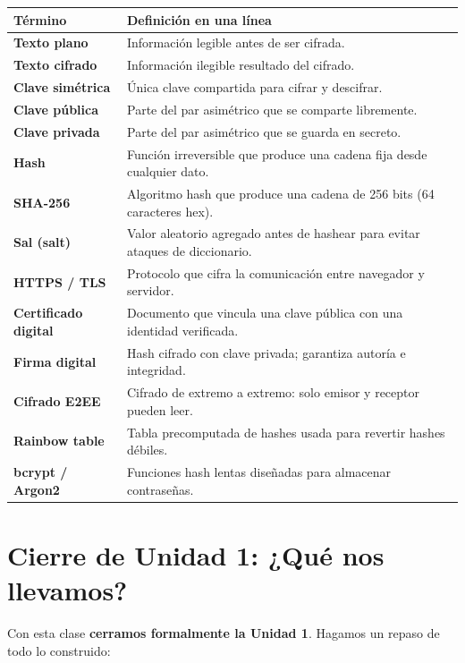 \documentclass[12pt,a4paper]{article}
\renewcommand{\arraystretch}{1.25}
\begin{document}
\renewcommand{\arraystretch}{1.4}
\begin{tabularx}{\textwidth}{>{\bfseries}p{4.5cm}X}
\toprule
\textbf{T\'ermino} & \textbf{Definici\'on en una línea} \\
\midrule
Texto plano & Informaci\'on legible antes de ser cifrada. \\
Texto cifrado & Informaci\'on ilegible resultado del cifrado. \\
Clave sim\'etrica & \'Unica clave compartida para cifrar y descifrar. \\
Clave p\'ublica & Parte del par asim\'etrico que se comparte libremente. \\
Clave privada & Parte del par asim\'etrico que se guarda en secreto. \\
Hash & Funci\'on irreversible que produce una cadena fija desde cualquier dato. \\
SHA-256 & Algoritmo hash que produce una cadena de 256 bits (64 caracteres hex). \\
Sal (salt) & Valor aleatorio agregado antes de hashear para evitar ataques de diccionario. \\
HTTPS / TLS & Protocolo que cifra la comunicaci\'on entre navegador y servidor. \\
Certificado digital & Documento que vincula una clave p\'ublica con una identidad verificada. \\
Firma digital & Hash cifrado con clave privada; garantiza autor\'ia e integridad. \\
Cifrado E2EE & Cifrado de extremo a extremo: solo emisor y receptor pueden leer. \\
Rainbow table & Tabla precomputada de hashes usada para revertir hashes d\'ebiles. \\
bcrypt / Argon2 & Funciones hash lentas diseñadas para almacenar contrase\~nas. \\
\bottomrule
\end{tabularx}

\newpage
\section{Cierre de Unidad 1: ¿Qu\'e nos llevamos?}

Con esta clase \textbf{cerramos formalmente la Unidad 1}. Hagamos un repaso de todo lo construido:
\end{document}
